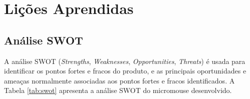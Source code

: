 \chapter{Lições Aprendidas}


\section{Análise SWOT}

A análise SWOT (\textit{Strengths}, \textit{Weaknesses}, \textit{Opportunities}, \textit{Threats}) é usada para identificar os pontos fortes e fracos do produto, e as principais oportunidades e ameaças normalmente associadas aos pontos fortes e fracos identificados. A Tabela \ref{tab:swot} apresenta a análise SWOT do micromouse desenvolvido.

